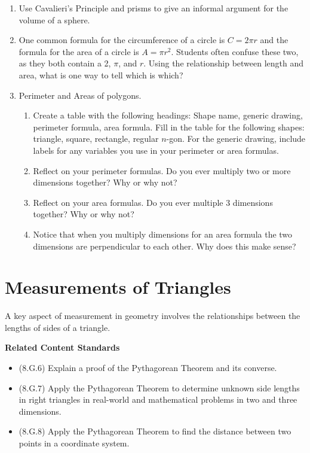 \documentclass[
]{book}
\providecommand{\tightlist}{%
  \setlength{\itemsep}{0pt}\setlength{\parskip}{0pt}}
\newenvironment{standards}{}{}
\let\stdsection\section
\renewcommand\section{\newpage\stdsection}
\theoremstyle{definition}
\theoremstyle{definition}
\theoremstyle{definition}
\theoremstyle{definition}
\theoremstyle{remark}
\begin{document}
\begin{enumerate}
\def\labelenumi{\arabic{enumi}.}
\item
  Use Cavalieri's Principle and prisms to give an informal argument for the volume of a sphere.
\item
  One common formula for the circumference of a circle is \(C= 2 \pi r\) and the formula for the area of a circle is \(A=\pi r^2\). Students often confuse these two, as they both contain a 2, \(\pi\), and \(r\). Using the relationship between length and area, what is one way to tell which is which?
\item
  Perimeter and Areas of polygons.

  \begin{enumerate}
  \def\labelenumii{\alph{enumii}.}
  \tightlist
  \item
    Create a table with the following headings: Shape name, generic drawing, perimeter formula, area formula. Fill in the table for the following shapes: triangle, square, rectangle, regular \(n\)-gon. For the generic drawing, include labels for any variables you use in your perimeter or area formulas.
  \item
    Reflect on your perimeter formulas. Do you ever multiply two or more dimensions together? Why or why not?
  \item
    Reflect on your area formulas. Do you ever multiple 3 dimensions together? Why or why not?
  \item
    Notice that when you multiply dimensions for an area formula the two dimensions are perpendicular to each other. Why does this make sense?
  \end{enumerate}
\end{enumerate}

\hypertarget{measurements-of-triangles}{%
\section{Measurements of Triangles}\label{measurements-of-triangles}}

A key aspect of measurement in geometry involves the relationships between the lengths of sides of a triangle.

\begin{standards}

\begin{center}
\textbf{Related Content Standards}

\end{center}

\begin{itemize}
\tightlist
\item
  (8.G.6) Explain a proof of the Pythagorean Theorem and its converse.
\item
  (8.G.7) Apply the Pythagorean Theorem to determine unknown side lengths in right triangles in real-world and mathematical problems in two and three dimensions.
\item
  (8.G.8) Apply the Pythagorean Theorem to find the distance between two points in a coordinate system.
\end{itemize}

\end{standards}
\end{document}
